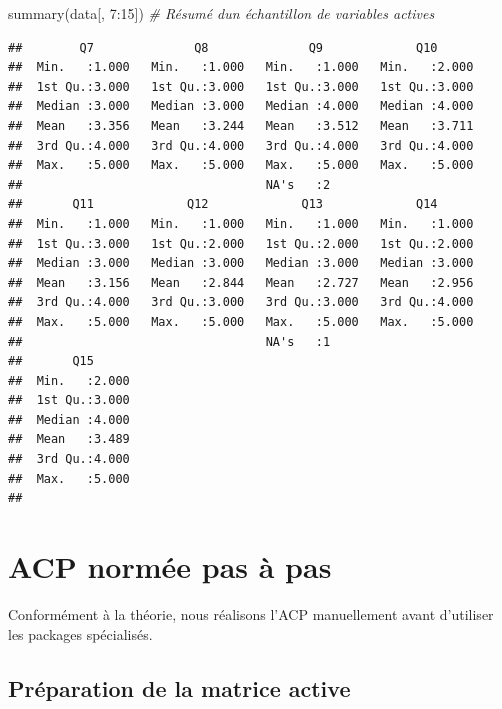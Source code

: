 \documentclass[
]{article}
\newenvironment{Shaded}{\begin{snugshade}}{\end{snugshade}}
\newcommand{\CommentTok}[1]{\textcolor[rgb]{0.56,0.35,0.01}{\textit{#1}}}
\newcommand{\DecValTok}[1]{\textcolor[rgb]{0.00,0.00,0.81}{#1}}
\newcommand{\FunctionTok}[1]{\textcolor[rgb]{0.00,0.00,0.00}{#1}}
\newcommand{\NormalTok}[1]{#1}
\newcommand{\SpecialCharTok}[1]{\textcolor[rgb]{0.00,0.00,0.00}{#1}}
\begin{document}
\begin{Shaded}
\begin{Highlighting}[]
\FunctionTok{summary}\NormalTok{(data[, }\DecValTok{7}\SpecialCharTok{:}\DecValTok{15}\NormalTok{]) }\CommentTok{\# Résumé d\textquotesingle{}un échantillon de variables actives}
\end{Highlighting}
\end{Shaded}

\begin{verbatim}
##        Q7              Q8              Q9             Q10       
##  Min.   :1.000   Min.   :1.000   Min.   :1.000   Min.   :2.000  
##  1st Qu.:3.000   1st Qu.:3.000   1st Qu.:3.000   1st Qu.:3.000  
##  Median :3.000   Median :3.000   Median :4.000   Median :4.000  
##  Mean   :3.356   Mean   :3.244   Mean   :3.512   Mean   :3.711  
##  3rd Qu.:4.000   3rd Qu.:4.000   3rd Qu.:4.000   3rd Qu.:4.000  
##  Max.   :5.000   Max.   :5.000   Max.   :5.000   Max.   :5.000  
##                                  NA's   :2                      
##       Q11             Q12             Q13             Q14       
##  Min.   :1.000   Min.   :1.000   Min.   :1.000   Min.   :1.000  
##  1st Qu.:3.000   1st Qu.:2.000   1st Qu.:2.000   1st Qu.:2.000  
##  Median :3.000   Median :3.000   Median :3.000   Median :3.000  
##  Mean   :3.156   Mean   :2.844   Mean   :2.727   Mean   :2.956  
##  3rd Qu.:4.000   3rd Qu.:3.000   3rd Qu.:3.000   3rd Qu.:4.000  
##  Max.   :5.000   Max.   :5.000   Max.   :5.000   Max.   :5.000  
##                                  NA's   :1                      
##       Q15       
##  Min.   :2.000  
##  1st Qu.:3.000  
##  Median :4.000  
##  Mean   :3.489  
##  3rd Qu.:4.000  
##  Max.   :5.000  
## 
\end{verbatim}

\hypertarget{acp-normuxe9e-pas-uxe0-pas}{%
\section{ACP normée pas à pas}\label{acp-normuxe9e-pas-uxe0-pas}}

Conformément à la théorie, nous réalisons l'ACP manuellement avant
d'utiliser les packages spécialisés.

\hypertarget{pruxe9paration-de-la-matrice-active}{%
\subsection{Préparation de la matrice
active}\label{pruxe9paration-de-la-matrice-active}}
\end{document}
